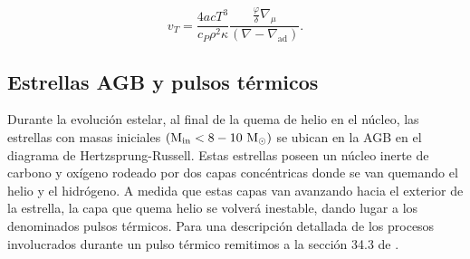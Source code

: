 \documentclass[baaa]{baaa}
\begin{document}
\begin{equation}
    v_T=\frac{4acT^3}{c_P\rho^2\kappa}\frac{\frac{\varphi}{\delta}\nabla_\mu}{(\nabla-\nabla_\text{ad})} .
\end{equation}



\subsection{Estrellas AGB y pulsos térmicos}


Durante la evolución estelar, al final de la quema de helio en el núcleo, las estrellas con masas iniciales $(\rm M_\text{in}<8-10 \ \rm M_\odot)$ se ubican en la AGB en el diagrama de Hertzsprung-Russell. Estas estrellas poseen un núcleo inerte de carbono y oxígeno rodeado por dos capas concéntricas donde se van quemando el helio y el hidrógeno.
A medida que estas capas van
avanzando hacia el exterior de la estrella, la capa que quema helio se volverá inestable, dando lugar a los denominados pulsos térmicos. Para una descripción detallada de los procesos involucrados durante un pulso térmico remitimos a la sección 34.3 de \cite{Kipphenhahn2013}.
\end{document}
